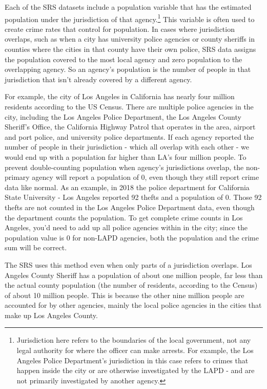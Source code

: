 \documentclass[
  12pt,
  openany]{book}
\begin{document}
Each of the SRS datasets include a population variable that has the estimated population under the jurisdiction of that agency.\footnote{Jurisdiction here refers to the boundaries of the local government, not any legal authority for where the officer can make arrests. For example, the Los Angeles Police Department's jurisdiction in this case refers to crimes that happen inside the city or are otherwise investigated by the LAPD - and are not primarily investigated by another agency.} This variable is often used to create crime rates that control for population. In cases where jurisdiction overlaps, such as when a city has university police agencies or county sheriffs in counties where the cities in that county have their own police, SRS data assigns the population covered to the most local agency and zero population to the overlapping agency. So an agency's population is the number of people in that jurisdiction that isn't already covered by a different agency.

For example, the city of Los Angeles in California has nearly four million residents according to the US Census. There are multiple police agencies in the city, including the Los Angeles Police Department, the Los Angeles County Sheriff's Office, the California Highway Patrol that operates in the area, airport and port police, and university police departments. If each agency reported the number of people in their jurisdiction - which all overlap with each other - we would end up with a population far higher than LA's four million people. To prevent double-counting population when agency's jurisdictions overlap, the non-primary agency will report a population of 0, even though they still report crime data like normal. As an example, in 2018 the police department for California State University - Los Angeles reported 92 thefts and a population of 0. Those 92 thefts are not counted in the Los Angeles Police Department data, even though the department counts the population. To get complete crime counts in Los Angeles, you'd need to add up all police agencies within in the city; since the population value is 0 for non-LAPD agencies, both the population and the crime sum will be correct.

The SRS uses this method even when only parts of a jurisdiction overlaps. Los Angeles County Sheriff has a population of about one million people, far less than the actual county population (the number of residents, according to the Census) of about 10 million people. This is because the other nine million people are accounted for by other agencies, mainly the local police agencies in the cities that make up Los Angeles County.
\end{document}
